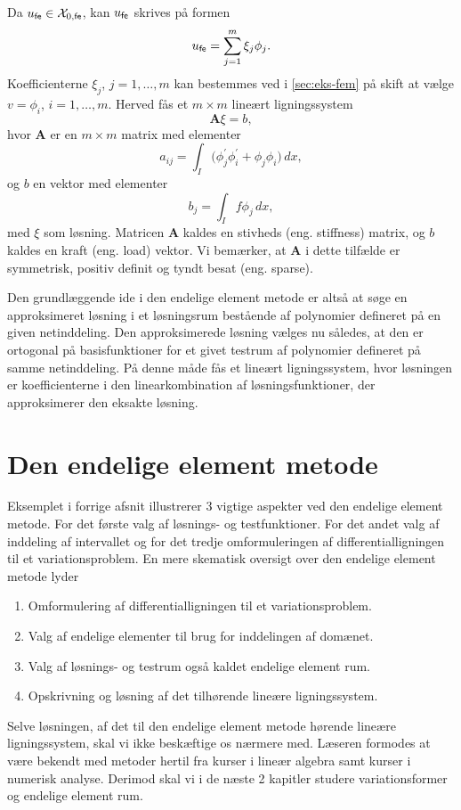 Da $u_{\mathsf{fe}} \in {\mathcal X}_{0,{\mathsf{fe}}}$, kan $u_{\mathsf{fe}}$ skrives på formen
\begin{equation}
  u_{\mathsf{fe}} = \sum_{j=1}^m \xi_j \phi_j .
\end{equation}
Koefficienterne $\xi_j$, $j=1,\ldots ,m$ kan bestemmes ved i 
\eqref{sec:eks-fem} på skift at vælge $v=\phi_i$, $i=1,\ldots,m$. 
Herved fås et $m\!\times\!m$ lineært ligningssystem
\begin{equation} \label{des1}
  \mathbf{A}\xi = b,
\end{equation}
hvor $\mathbf{A}$ er en $m\!\times\!m$ matrix med elementer
\begin{equation} \label{des2}
  a_{ij} = \int_I \bigl( \phi_j^{'}\phi_i^{'} + \phi_j\phi_i\bigr)\, dx,
\end{equation}
og $b$ en vektor med elementer
\begin{equation} \label{des3}
  b_j = \int_I f\phi_j\, dx,
\end{equation} 
med $\xi$ som løsning. Matricen $\mathbf{A}$ kaldes en stivheds (eng.
stiffness) matrix, og $b$ kaldes en kraft (eng. load) vektor. Vi
bemærker, at $\mathbf{A}$ i dette tilfælde er symmetrisk, positiv
definit og tyndt besat (eng. sparse).

Den grund\-læg\-gen\-de ide i den endelige element metode er alt\-så at sø\-ge
en ap\-prok\-si\-me\-ret løsning i et løsningsrum bestående af polynomier
defineret på en given netinddeling. Den approksimerede løsning vælges nu
således, at den er ortogonal på basisfunktioner for et givet testrum
af polynomier defineret på samme netinddeling. På denne måde fås et 
lineært ligningssystem, hvor løsningen er koefficienterne i den
linearkombination af løsningsfunktioner, der approksimerer den eksakte
løsning.

\section{Den endelige element metode}
Eksemplet i forrige afsnit illustrerer 3 vigtige aspekter ved den
endelige element metode. For det første valg af løsnings- og
testfunktioner. For det andet valg af inddeling af intervallet og for
det tredje omformuleringen af differentialligningen til et
variationsproblem. En mere skematisk oversigt over den endelige
element metode lyder
\begin{enumerate}
  \item Omformulering af differentialligningen til et
        variationsproblem.
  \item Valg af endelige elementer til brug for inddelingen af domænet.
  \item Valg af løsnings- og testrum også kaldet endelige element rum.
  \item Opskrivning og løsning af det tilhørende lineære ligningssystem.
\end{enumerate}
Selve løsningen, af det til den endelige element metode hørende
lineære lignings\-sy\-stem, skal vi ikke beskæftige os nærmere med.
Læseren formodes at være bekendt med metoder hertil fra kurser i lineær algebra
samt kurser i numerisk analyse. Derimod skal vi i de næste 2 kapitler
studere variationsformer og endelige element rum.

